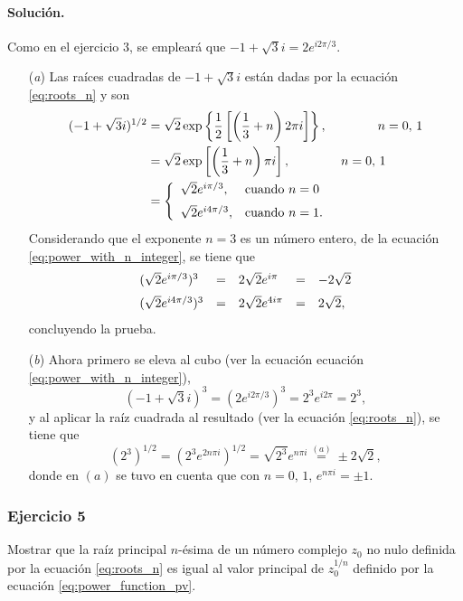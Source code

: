 \documentclass[a4paper]{report}
\begin{document}
\paragraph{Solución.} Como en el ejercicio 3, se empleará que \(-1+\sqrt{3}i=2e^{i2\pi/3}\).
\begin{enumerate}
 \item[(\textit{a})] Las raíces cuadradas de \(-1+\sqrt{3}i\) están dadas por la ecuación \ref{eq:roots_n} y son
 \begin{align*}
  (-1+\sqrt{3}i)^{1/2}&=\sqrt{2}\exp\left\{\frac{1}{2}\left[\left(\frac{1}{3}+n\right)2\pi i\right]\right\},\qquad\qquad n=0,\,1\\
  &=\sqrt{2}\exp\left[\left(\frac{1}{3}+n\right)\pi i\right],\qquad\qquad n=0,\,1\\
  &=\left\{ 
   \begin{array}{ll}
    \sqrt{2}e^{i\pi/3}, &\textrm{cuando }n=0\\[\medskipamount]
    \sqrt{2}e^{i4\pi/3}, &\textrm{cuando }n=1.
   \end{array}
   \right.
 \end{align*}
 Considerando que el exponente \(n=3\) es un número entero, de la ecuación \ref{eq:power_with_n_integer}, se tiene que 
 \[
 \begin{array}{lllll}
  (\sqrt{2}e^{i\pi/3})^3&=&2\sqrt{2}e^{i\pi}&=&-2\sqrt{2}\\[\medskipamount]
  (\sqrt{2}e^{i4\pi/3})^3&=&2\sqrt{2}e^{4i\pi}&=&2\sqrt{2},
 \end{array}
 \]
 concluyendo la prueba.
 \item[(\textit{b})] Ahora primero se eleva al cubo (ver la ecuación ecuación \ref{eq:power_with_n_integer}),
 \[
  (-1+\sqrt{3}i)^3=(2e^{i2\pi/3})^3=2^3e^{i2\pi}=2^3,
 \]
 y al aplicar la raíz cuadrada al resultado (ver la ecuación \ref{eq:roots_n}), se tiene que 
 \[
  (2^3)^{1/2}=(2^3e^{2n\pi i})^{1/2}=\sqrt{2^3}e^{n\pi i}\overset{(a)}{=}\pm2\sqrt{2},
 \]
 donde en \((a)\) se tuvo en cuenta que con \(n=0,\,1\), \(e^{n\pi i}=\pm1\).
\end{enumerate}

\subsubsection{Ejercicio 5}

Mostrar que la raíz principal \(n\)-ésima de un número complejo \(z_0\) no nulo definida por la ecuación \ref{eq:roots_n} es igual al valor principal de \(z_0^{1/n}\) definido por la ecuación \ref{eq:power_function_pv}.
\end{document}
